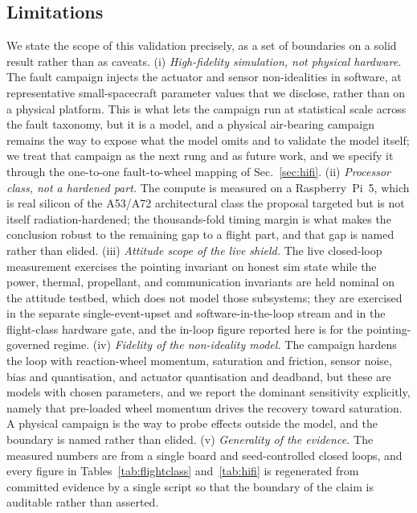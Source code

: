 \documentclass[11pt]{article}
\begin{document}
\subsection{Limitations}
\label{sec:limitations}
We state the scope of this validation precisely, as a set of boundaries on a solid result rather
than as caveats. (i) \emph{High-fidelity simulation, not physical hardware.} The fault campaign
injects the actuator and sensor non-idealities in software, at representative small-spacecraft
parameter values that we disclose, rather than on a physical platform. This is what lets the
campaign run at statistical scale across the fault taxonomy, but it is a model, and a physical
air-bearing campaign remains the way to expose what the model omits and to validate the model
itself; we treat that campaign as the next rung and as future work, and we specify it through the
one-to-one fault-to-wheel mapping of Sec.~\ref{sec:hifi}. (ii) \emph{Processor class,
not a hardened part.} The compute is measured on a Raspberry~Pi~5, which is real silicon of the
A53/A72 architectural class the proposal targeted but is not itself radiation-hardened; the
thousands-fold timing margin is what makes the conclusion robust to the remaining gap to a flight
part, and that gap is named rather than elided. (iii) \emph{Attitude scope of the live shield.}
The live closed-loop measurement exercises the pointing invariant on honest sim state while the
power, thermal, propellant, and communication invariants are held nominal on the attitude testbed,
which does not model those subsystems; they are exercised in the separate single-event-upset and
software-in-the-loop stream and in the flight-class hardware gate, and the in-loop figure reported
here is for the pointing-governed regime. (iv) \emph{Fidelity of the non-ideality model.} The
campaign hardens the loop with reaction-wheel momentum, saturation and friction, sensor noise, bias
and quantisation, and actuator quantisation and deadband, but these are models with chosen
parameters, and we report the dominant sensitivity explicitly, namely that pre-loaded wheel
momentum drives the recovery toward saturation. A physical campaign is the way to probe effects
outside the model, and the boundary is named rather than elided. (v) \emph{Generality of the
evidence.} The measured numbers are from a single board and seed-controlled closed loops, and every
figure in Tables~\ref{tab:flightclass} and~\ref{tab:hifi} is regenerated from committed evidence by
a single script so that the boundary of the claim is auditable rather than asserted.
\end{document}
